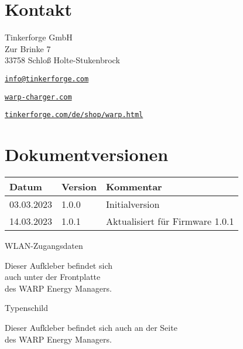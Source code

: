 \documentclass[a4paper,10pt]{article}
\begin{document}
\begin{multicols*}{2}
	\section{Kontakt}
	Tinkerforge GmbH\\ Zur Brinke 7\\ 33758 Schloß Holte-Stukenbrock
	\begin{description}[leftmargin=!,labelwidth=\widthof{\textbf{Website}}]
		\item[E-Mail] \href{mailto:info@tinkerforge.com}{\texttt{info@tinkerforge.com}}
		\item[Website] \href{https://warp-charger.com}{\texttt{warp-charger.com}}
		\item[Telefon] 
		\item[Shop] \href{https://tinkerforge.com/de/shop/warp.html}{\texttt{tinkerforge.com/de/shop/warp.html}}
	\end{description}

	\section{Dokumentversionen}
	\begin{tabular}{lll}
		\toprule
		Datum      & Version & Kommentar                       \\
		\midrule
		03.03.2023 & 1.0.0   & Initialversion                  \\
		14.03.2023 & 1.0.1   & Aktualisiert für Firmware 1.0.1 \\
		\bottomrule
	\end{tabular}

	\vfill
	\null
	\newpage

	\columnbreak
    
    \end{multicols*}

    \appendix

	\newpage
	\pagecolor{covergray}\afterpage{\nopagecolor}

   \begin{multicols*}{2}
    \pagestyle{empty}
    \null
    \vfill
	\color{white}
    WLAN-Zugangsdaten
    \begin{tcolorbox}[width=4.2cm,height=2.7cm, boxrule=0.25mm]

    \end{tcolorbox}
	Dieser Aufkleber befindet sich\\ auch unter der Frontplatte\\des WARP Energy
	Managers.
    \columnbreak

    \null
    \vfill
    Typenschild
    \begin{tcolorbox}[width=7.8cm,height=4.1cm, boxrule=0.25mm]

    \end{tcolorbox}
    Dieser Aufkleber befindet sich auch an der Seite\\ des WARP Energy Managers.
\end{multicols*}
\end{document}

